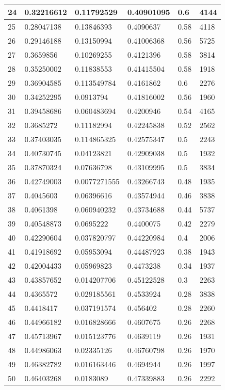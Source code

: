 \begin{longtable}{|l|l|l|l|l|l|}
24 & 0.32216612 & 0.11792529 & 0.40901095 & 0.6 & 4144 \\ \hline 
25 & 0.28047138 & 0.13846393 & 0.4090637 & 0.58 & 4118 \\ \hline 
26 & 0.29146188 & 0.13150994 & 0.41006368 & 0.56 & 5725 \\ \hline 
27 & 0.3659856 & 0.10269255 & 0.4121396 & 0.58 & 3814 \\ \hline 
28 & 0.35250002 & 0.11838553 & 0.41415504 & 0.58 & 1918 \\ \hline 
29 & 0.36904585 & 0.113549784 & 0.4161862 & 0.6 & 2276 \\ \hline 
30 & 0.34252295 & 0.0913794 & 0.41816002 & 0.56 & 1960 \\ \hline 
31 & 0.39458686 & 0.060483694 & 0.4200946 & 0.54 & 4165 \\ \hline 
32 & 0.3685272 & 0.11182994 & 0.42245838 & 0.52 & 2562 \\ \hline 
33 & 0.37403035 & 0.114865325 & 0.42575347 & 0.5 & 2243 \\ \hline 
34 & 0.40730745 & 0.04123821 & 0.42909038 & 0.5 & 1932 \\ \hline 
35 & 0.37870324 & 0.07636798 & 0.43109995 & 0.5 & 3834 \\ \hline 
36 & 0.42749003 & 0.0077271555 & 0.43266743 & 0.48 & 1935 \\ \hline 
37 & 0.4045603 & 0.06396616 & 0.43574944 & 0.46 & 3838 \\ \hline 
38 & 0.4061398 & 0.060940232 & 0.43734688 & 0.44 & 5737 \\ \hline 
39 & 0.40548873 & 0.0695222 & 0.4400075 & 0.42 & 2279 \\ \hline 
40 & 0.42290604 & 0.037820797 & 0.44220984 & 0.4 & 2006 \\ \hline 
41 & 0.41918692 & 0.05953094 & 0.44487923 & 0.38 & 1943 \\ \hline 
42 & 0.42004433 & 0.05969823 & 0.4473238 & 0.34 & 1937 \\ \hline 
43 & 0.43857652 & 0.014207706 & 0.45122528 & 0.3 & 2263 \\ \hline 
44 & 0.4365572 & 0.029185561 & 0.4533924 & 0.28 & 3838 \\ \hline 
45 & 0.4418417 & 0.037191574 & 0.456402 & 0.28 & 2260 \\ \hline 
46 & 0.44966182 & 0.016828666 & 0.4607675 & 0.26 & 2268 \\ \hline 
47 & 0.45713967 & 0.015123776 & 0.4639119 & 0.26 & 1931 \\ \hline 
48 & 0.44986063 & 0.02335126 & 0.46760798 & 0.26 & 1970 \\ \hline 
49 & 0.46382782 & 0.016163446 & 0.4694944 & 0.26 & 1997 \\ \hline 
50 & 0.46403268 & 0.0183089 & 0.47339883 & 0.26 & 2292 \\ \hline 
\end{longtable}